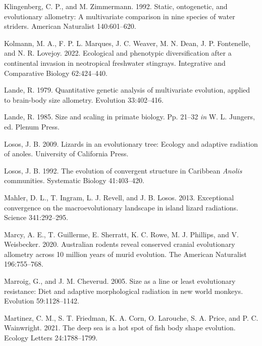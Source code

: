 \documentclass[
  11pt,
]{article}
\newlength{\cslhangindent}
\newlength{\cslentryspacingunit} %
\newenvironment{CSLReferences}[2] %
 {%
  \setlength{\parindent}{0pt}
  \ifodd #1
  \let\oldpar\par
  \def\par{\hangindent=\cslhangindent\oldpar}
  \fi
  \setlength{\parskip}{#2\cslentryspacingunit}
 }%
 {}
\begin{document}
\begin{CSLReferences}{1}{0}
\leavevmode{}%
Klingenberg, C. P., and M. Zimmermann. 1992. Static, ontogenetic, and
evolutionary allometry: A multivariate comparison in nine species of
water striders. American Naturalist 140:601--620.

\leavevmode{}%
Kolmann, M. A., F. P. L. Marques, J. C. Weaver, M. N. Dean, J. P.
Fontenelle, and N. R. Lovejoy. 2022. Ecological and phenotypic
diversification after a continental invasion in neotropical freshwater
stingrays. Integrative and Comparative Biology 62:424--440.

\leavevmode{}%
Lande, R. 1979. Quantitative genetic analysis of multivariate evolution,
applied to brain-body size allometry. Evolution 33:402--416.

\leavevmode{}%
Lande, R. 1985. Size and scaling in primate biology. Pp. 21--32
\emph{in} W. L. Jungers, ed. Plenum Press.

\leavevmode{}%
Losos, J. B. 2009. Lizards in an evolutionary tree: Ecology and adaptive
radiation of anoles. University of California Press.

\leavevmode{}%
Losos, J. B. 1992. The evolution of convergent structure in {C}aribbean
\emph{{A}nolis} communities. Systematic Biology 41:403--420.

\leavevmode{}%
Mahler, D. L., T. Ingram, L. J. Revell, and J. B. Losos. 2013.
Exceptional convergence on the macroevolutionary landscape in island
lizard radiations. Science 341:292--295.

\leavevmode{}%
Marcy, A. E., T. Guillerme, E. Sherratt, K. C. Rowe, M. J. Phillips, and
V. Weisbecker. 2020. Australian rodents reveal conserved cranial
evolutionary allometry across 10 million years of murid evolution. The
American Naturalist 196:755--768.

\leavevmode{}%
Marroig, G., and J. M. Cheverud. 2005. Size as a line or least
evolutionary resistance: Diet and adaptive morphological radiation in
new world monkeys. Evolution 59:1128--1142.

\leavevmode{}%
Martinez, C. M., S. T. Friedman, K. A. Corn, O. Larouche, S. A. Price,
and P. C. Wainwright. 2021. The deep sea is a hot spot of fish body
shape evolution. Ecology Letters 24:1788--1799.


\end{CSLReferences}
\end{document}
